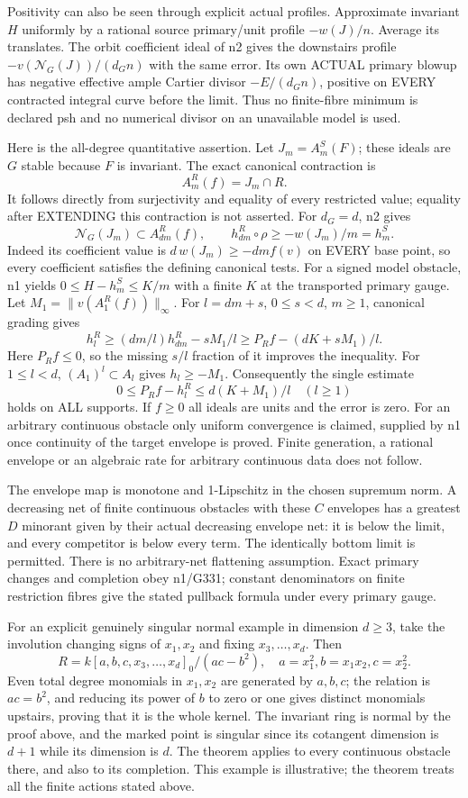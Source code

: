\documentclass[11pt]{article}
\begin{document}
Positivity can also be seen through explicit actual profiles. Approximate
invariant $H$ uniformly by a rational source primary/unit profile
$-w(J)/n$. Average its translates. The orbit coefficient ideal of n2
gives the downstairs profile $-v(\mathcal N_G(J))/(d_G n)$ with the same
error. Its own ACTUAL primary blowup has negative effective ample
Cartier divisor $-E/(d_G n)$, positive on EVERY contracted integral curve
before the limit. Thus no finite-fibre minimum is declared psh and no
numerical divisor on an unavailable model is used.

Here is the all-degree quantitative assertion. Let $J_m=A_m^S(F)$;
these ideals are $G$ stable because $F$ is invariant. The exact canonical
contraction is
\[
 A_m^R(f)=J_m\cap R.
\]
It follows directly from surjectivity and equality of every restricted
value; equality after EXTENDING this contraction is not asserted.
For $d_G=d$, n2 gives
\[
 \mathcal N_G(J_m)\subset A_{dm}^R(f),\qquad
 h_{dm}^R\circ\rho\ge -w(J_m)/m=h_m^S.
\]
Indeed its coefficient value is $d\,w(J_m)\ge-dm f(v)$ on EVERY base
point, so every coefficient satisfies the defining canonical tests.
For a signed model obstacle, n1 yields $0\le H-h_m^S\le K/m$ with a
finite $K$ at the transported primary gauge. Let
$M_1=\|v(A_1^R(f))\|_\infty$. For $l=dm+s$, $0\le s<d$, $m\ge1$,
canonical grading gives
\[
 h_l^R\ge(dm/l)h_{dm}^R-sM_1/l
       \ge P_Rf-(dK+sM_1)/l.
\]
Here $P_R f\le0$, so the missing $s/l$ fraction of it improves the
inequality. For $1\le l<d$, $(A_1)^l\subset A_l$ gives $h_l\ge-M_1$.
Consequently the single estimate
\[
 0\le P_Rf-h_l^R\le d(K+M_1)/l\quad(l\ge1)
\]
holds on ALL supports. If $f\ge0$ all ideals are units and the error is
zero. For an arbitrary continuous obstacle only uniform convergence is
claimed, supplied by n1 once continuity of the target envelope is proved.
Finite generation, a rational envelope or an algebraic rate for arbitrary
continuous data does not follow.

The envelope map is monotone and 1-Lipschitz in the chosen supremum norm.
A decreasing net of finite continuous obstacles with these $C$ envelopes
has a greatest $D$ minorant given by their actual decreasing envelope net:
it is below the limit, and every competitor is below every term. The
identically bottom limit is permitted. There is no arbitrary-net
flattening assumption. Exact primary changes and completion obey n1/G331;
constant denominators on finite restriction fibres give the stated
pullback formula under every primary gauge.

For an explicit genuinely singular normal example in dimension $d\ge3$,
take the involution changing signs of $x_1,x_2$ and fixing $x_3,\ldots,x_d$.
Then
\[
 R=k[a,b,c,x_3,\ldots,x_d]_0/(ac-b^2),\quad
 a=x_1^2, b=x_1x_2, c=x_2^2.
\]
Even total degree monomials in $x_1,x_2$ are generated by $a,b,c$;
the relation is $ac=b^2$, and reducing its power of $b$ to zero or one
gives distinct monomials upstairs, proving that it is the whole kernel.
The invariant ring is normal by the proof above, and the marked point is
singular since its cotangent dimension is $d+1$ while its dimension is $d$.
The theorem applies to every continuous obstacle there, and also to its
completion. This example is illustrative; the theorem treats all the
finite actions stated above.
\end{document}
